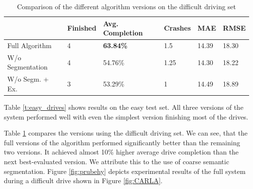 \documentclass{ctuthesis/ctuthesis}
\begin{document}
\begin{table}[]
\tabcolsep=0.11cm
\begin{tabular}{l|lllll}
\hline
                                      & Finished & Avg. Completion & Crashes & MAE   & RMSE   \\ \hline
Full Algorithm                         & 4               & \textbf{63.84\%}         & 1.5     & 14.39 & 18.30    \\
W/o Segmentation                   & 4               & 54.76\%                  & 1.25    & 14.30 & 18.22 \\
W/o Segm. + Ex. & 3               & 53.29\%                  & 1       & 14.49 & 18.89    \\ \hline
\end{tabular}
\caption{Comparison of the different algorithm versions on the difficult driving set}\label{t:difficult_drives}
\end{table}

Table \ref{t:easy_drives} shows results on the easy test set. All three versions of the system performed well with even the simplest version finishing most of the drives. \par
Table \ref{t:difficult_drives} compares the versions using the difficult driving set. We can see, that the full versions of the algorithm performed significantly better than the remaining two versions. It achieved almost 10\% higher average drive completion than the next best-evaluated version. We attribute this to the use of coarse semantic segmentation. Figure \ref{fig:prubehy} depicts experimental results of the full system during a difficult drive shown in Figure \ref{fig:CARLA}.\par
\end{document}
